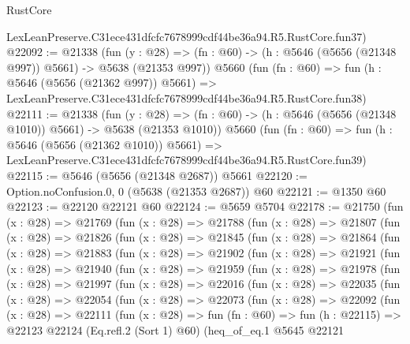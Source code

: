 \begin{lexlean}{RustCore}
\begin{coremodule}
    LexLeanPreserve.C31ece431dfcfc7678999cdf44be36a94.R5.RustCore.fun37)
@22092 := @21338
    (fun (y : @28) => (fn : @60) -> (h : @5646 (@5656 (@21348 @997)) @5661) -> @5638 (@21353 @997))
    @5660
    (fun (fn : @60) =>
    fun (h : @5646 (@5656 (@21362 @997)) @5661) =>
    LexLeanPreserve.C31ece431dfcfc7678999cdf44be36a94.R5.RustCore.fun38)
@22111 := @21338
    (fun (y : @28) =>
    (fn : @60) -> (h : @5646 (@5656 (@21348 @1010)) @5661) -> @5638 (@21353 @1010))
    @5660
    (fun (fn : @60) =>
    fun (h : @5646 (@5656 (@21362 @1010)) @5661) =>
    LexLeanPreserve.C31ece431dfcfc7678999cdf44be36a94.R5.RustCore.fun39)
@22115 := @5646 (@5656 (@21348 @2687)) @5661
@22120 := Option.noConfusion.{0, 0} (@5638 (@21353 @2687)) @60
@22121 := @1350 @60
@22123 := @22120 @22121 @60
@22124 := @5659 @5704
@22178 := @21750
    (fun (x : @28) =>
    @21769
      (fun (x : @28) =>
      @21788
        (fun (x : @28) =>
        @21807
          (fun (x : @28) =>
          @21826
            (fun (x : @28) =>
            @21845
              (fun (x : @28) =>
              @21864
                (fun (x : @28) =>
                @21883
                  (fun (x : @28) =>
                  @21902
                    (fun (x : @28) =>
                    @21921
                      (fun (x : @28) =>
                      @21940
                        (fun (x : @28) =>
                        @21959
                          (fun (x : @28) =>
                          @21978
                            (fun (x : @28) =>
                            @21997
                              (fun (x : @28) =>
                              @22016
                                (fun (x : @28) =>
                                @22035
                                  (fun (x : @28) =>
                                  @22054
                                    (fun (x : @28) =>
                                    @22073
                                      (fun (x : @28) =>
                                      @22092
                                        (fun (x : @28) =>
                                        @22111
                                          (fun (x : @28) =>
                                          fun (fn : @60) =>
                                          fun (h : @22115) =>
                                          @22123
                                            @22124
                                            (Eq.refl.{2} (Sort 1) @60)
                                            (heq_of_eq.{1}
                                              @5645
                                              @22121

\end{coremodule}
\end{lexlean}
